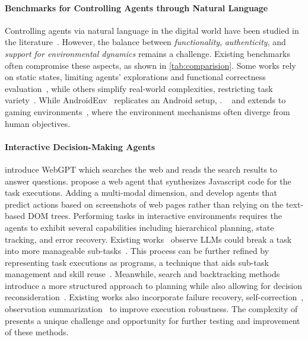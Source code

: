 \paragraph{Benchmarks for Controlling Agents through Natural Language} 
Controlling agents via natural language in the digital world have been studied in the literature~\citep{branavan2009reinforcement,shi2017world,liu2018reinforcement, toyama2021androidenv,deng2023mind2web,li2020mapping,xu2021grounding}. 
However, the balance between \emph{functionality}, \emph{authenticity}, and \emph{support for environmental dynamics} remains a challenge. 
Existing benchmarks often compromise these aspects, as shown in \autoref{tab:comparision}. 
Some works rely on static states, limiting agents' explorations and functional correctness evaluation~\citep{shi2017world,deng2023mind2web}, while others simplify real-world complexities, restricting task variety~\citep{yao2022webshop,liu2018reinforcement}.
While AndroidEnv~\citep{toyama2021androidenv} replicates an Android setup, . ~\citep{ai2thor, shridhar_alfred:_2019, puig_virtualhome:_2018} and extends to gaming environments~\citep{fan2022minedojo, kuttler_nethack_2020}, where the environment mechanisms often diverge from human objectives.

\paragraph{Interactive Decision-Making Agents} 
\cite{nakano2021webgpt} introduce WebGPT which searches the web and reads the search results to answer questions. \cite{gur2023real} propose a web agent that synthesizes Javascript code for the task executions. Adding a multi-modal dimension, \cite{lee2023pix2struct} and \cite{shaw2023pixels} develop agents that predict actions based on screenshots of web pages rather than relying on the text-based DOM trees.
Performing tasks in interactive environments requires the agents to exhibit several capabilities including hierarchical planning, state tracking, and error recovery.
Existing works~\citep{huang2022language,madaan2022language,li2023take} observe LLMs could break a task into more manageable sub-tasks~\citep{zhou2022show}.
This process can be further refined by representing task executions as programs, a technique that aids sub-task management and skill reuse~\citep{zhou2021hierarchical,liang2023code,wang2023voyager,gao2023pal}. Meanwhile, search and backtracking methods introduce a more structured approach to planning while also allowing for decision reconsideration~\citep{yao2023tree,long2023large}. 
Existing works also incorporate failure recovery, self-correction~\citep{shinn2023reflexion,kim2023language}, observation summarization~\citep{sridhar2023hierarchical} to improve execution robustness.
The complexity of \ours presents a unique challenge and opportunity for further testing and improvement of these methods.

